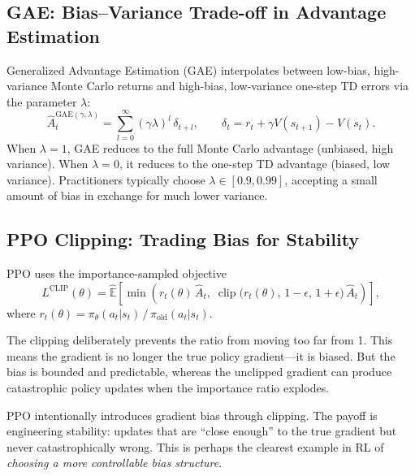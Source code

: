 \subsection{GAE: Bias--Variance Trade-off in Advantage Estimation}

Generalized Advantage Estimation (GAE) interpolates between low-bias,
high-variance Monte Carlo returns and high-bias, low-variance one-step TD
errors via the parameter $\lambda$:
\begin{equation}
  \hat{A}_t^{\text{GAE}(\gamma,\lambda)}
  = \sum_{l=0}^{\infty} (\gamma\lambda)^l\, \delta_{t+l},
  \qquad
  \delta_t = r_t + \gamma V(s_{t+1}) - V(s_t).
\end{equation}
When $\lambda = 1$, GAE reduces to the full Monte Carlo advantage (unbiased,
high variance).  When $\lambda = 0$, it reduces to the one-step TD advantage
(biased, low variance).  Practitioners typically choose $\lambda \in [0.9, 0.99]$,
accepting a small amount of bias in exchange for much lower variance.

\subsection{PPO Clipping: Trading Bias for Stability}

PPO uses the importance-sampled objective
\begin{equation}
  L^{\text{CLIP}}(\theta) = \hat{\mathbb{E}}\!\left[\min\!\left(
    r_t(\theta)\,\hat{A}_t,\;
    \operatorname{clip}\!\bigl(r_t(\theta),\, 1{-}\epsilon,\, 1{+}\epsilon\bigr)\,
    \hat{A}_t
  \right)\right],
\end{equation}
where $r_t(\theta) = \pi_\theta(a_t|s_t)\,/\,\pi_{\text{old}}(a_t|s_t)$.

The clipping deliberately prevents the ratio from moving too far from 1.  This
means the gradient is no longer the true policy gradient---it is biased.  But
the bias is bounded and predictable, whereas the unclipped gradient can produce
catastrophic policy updates when the importance ratio explodes.

\begin{keyidea}
PPO intentionally introduces gradient bias through clipping.  The payoff is
engineering stability: updates that are ``close enough'' to the true gradient but
never catastrophically wrong.  This is perhaps the clearest example in RL of
\emph{choosing a more controllable bias structure}.
\end{keyidea}


